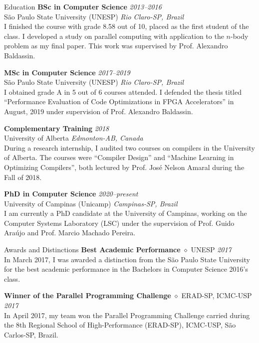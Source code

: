 \documentclass{resume}
\begin{document}

\begin{rSection}{Education}
{\bf BSc in Computer Science} \hfill {\em 2013--2016} \\
{\sc São Paulo State University (UNESP)} \hfill {\em Rio Claro-SP, Brazil} \\
I finished the course with grade 8.58 out of 10, placed as the first student of
the class. I developed a study on parallel computing with application to the
$n$-body problem as my final paper. This work was supervised by Prof. Alexandro
Baldassin.

{\bf MSc in Computer Science} \hfill {\em 2017--2019} \\
{\sc São Paulo State University (UNESP)} \hfill {\em Rio Claro-SP, Brazil} \\
I obtained grade A in 5 out of 6 courses attended. I defended the thesis titled
``Performance Evaluation of Code Optimizations in FPGA Accelerators'' in August,
2019 under supervision of Prof. Alexandro Baldassin.

{\bf Complementary Training} \hfill {\em 2018} \\
{\sc University of Alberta} \hfill {\em Edmonton-AB, Canada} \\
During a research internship, I audited two courses on compilers in the
University of Alberta. The courses were ``Compiler Design'' and ``Machine
Learning in Optimizing Compilers'', both lectured by Prof. José Nelson Amaral
during the Fall of 2018.

{\bf PhD in Computer Science} \hfill {\em 2020--present} \\
{\sc University of Campinas (Unicamp)} \hfill {\em Campinas-SP, Brazil} \\
I am currently a PhD candidate at the University of Campinas, working on the
Computer Systems Laboratory (LSC) under the supervision of Prof. Guido Araújo
and Prof. Marcio Machado Pereira.
\end{rSection}


\begin{rSection}{Awards and Distinctions}
{\bf Best Academic Performance} $\diamond$ {UNESP} \hfill{\em 2017} \\
In March 2017, I was awarded a distinction from the São Paulo State University
for the best academic performance in the Bachelors in Computer Science 2016's
class.

{\bf Winner of the Parallel Programming Challenge} $\diamond$ {ERAD-SP, ICMC-USP} \hfill{\em 2017} \\
In April 2017, my team won the Parallel Programming Challenge carried during the
8th Regional School of High-Performance (ERAD-SP), ICMC-USP, São Carlos-SP,
Brazil.
\end{rSection}
\end{document}
